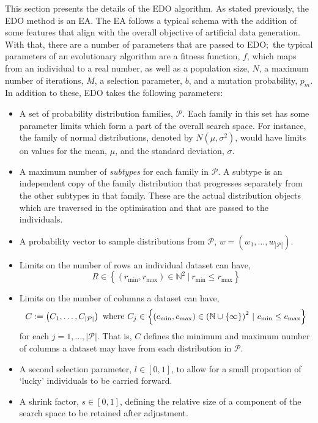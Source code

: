 This section presents the details of the EDO algorithm. As stated previously,
the EDO method is an EA. The EA follows a typical schema with the addition of
some features that align with the overall objective of artificial data
generation. With that, there are a number of parameters that are passed to EDO;\
the typical parameters of an evolutionary algorithm are a fitness function,
\(f\), which maps from an individual to a real number, as well as a population
size, \(N\), a maximum number of iterations, \(M\), a selection parameter,
\(b\), and a mutation probability, \(p_m\). In addition to these, EDO takes the
following parameters:
\begin{itemize}
    \item A set of probability distribution families, \(\mathcal{P}\). Each
        family in this set has some parameter limits which form a part of the
        overall search space. For instance, the family of normal distributions,
        denoted by \(N(\mu, \sigma^2)\), would have limits on values for the
        mean, \(\mu\), and the standard deviation, \(\sigma\).
    \item A maximum number of \emph{subtypes} for each family in
        \(\mathcal{P}\). A subtype is an independent copy of the family
        distribution that progresses separately from the other subtypes in that
        family. These are the actual distribution objects which are traversed in
        the optimisation and that are passed to the individuals.
    \item A probability vector to sample distributions from \(\mathcal{P}\),
        \(w = \left(w_1, \ldots, w_{|\mathcal{P}|}\right)\).
    \item Limits on the number of rows an individual dataset can have,
        \[
            R \in \left\{%
                (r_{\min}, r_{\max}) \in \mathbb{N}^2~|~r_{\min} \leq r_{\max}
            \right\}
        \]
    \item Limits on the number of columns a dataset can have,
        \[
            C := \left(C_1, \ldots, C_{|\mathcal{P}|}\right)
            \text{ where }
            C_j \in \left\{ (c_{\min}, c_{\max}) \in {%
                \left(\mathbb{N}\cup\{\infty\}\right)
            }^2~|~c_{\min} \leq c_{\max}\right\}
        \]
        for each \(j = 1, \ldots, |\mathcal{P}|\). That is, \(C\) defines the
        minimum and maximum number of columns a dataset may have from each
        distribution in \(\mathcal{P}\).
    \item A second selection parameter, \(l \in [0, 1]\), to allow for a
        small proportion of `lucky' individuals to be carried forward.
    \item A shrink factor, \(s \in [0, 1]\), defining the relative size of a
        component of the search space to be retained after adjustment.
\end{itemize}

